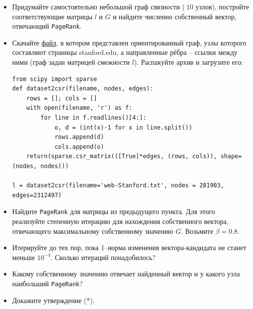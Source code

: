 \documentclass[prb,papersize=a4paper,notitlepage]{revtex4-1}%
\begin{document}
\begin{enumerate}
\begin{itemize}
\item Придумайте самостоятельно небольшой граф связности ($~10$ узлов), постройте соответствующие матрицы $l$ и $G$ и найдите численно собственный вектор, отвечающий \lstinline{PageRank}.
\item Скачайте \href{http://snap.stanford.edu/data/web-Stanford.txt.gz}{файл}, в котором представлен ориентированный граф, узлы которого составляют страницы stanford.edu, а направленные рёбра -- ссылки между ними (граф задан матрицей смежности $l$). Распакуйте архив и загрузите его:
\lstset{language=Python}
\lstset{frame=lines}
\lstset{basicstyle=\ttfamily}
\begin{lstlisting}
from scipy import sparse
def dataset2csr(filename, nodes, edges):
    rows = []; cols = []    
    with open(filename, 'r') as f:
        for line in f.readlines()[4:]:
            o, d = (int(x)-1 for x in line.split())
            rows.append(d)
            cols.append(o)
    return(sparse.csr_matrix(([True]*edges, (rows, cols)), shape=(nodes, nodes)))

l = dataset2csr(filename='web-Stanford.txt', nodes = 281903, edges=2312497)
\end{lstlisting}
\item Найдите \lstinline{PageRank} для матрицы из предыдущего пункта. Для этого реализуйте степенную итерацию для нахождения собственного вектора, отвечающего максимальному собственному значению $G$. Возьмите $\beta = 0.8$.
\item Итерируйте до тех пор, пока 1--норма изменения вектора-кандидата не станет меньше $10^{-4}$. Сколько итераций понадобилось?
\item Какому собственному значению отвечает найденный вектор и у какого узла наибольший \lstinline{PageRank}? 
\item Докажите утверждение (*).
\end{itemize}



\end{enumerate}
\end{document}
